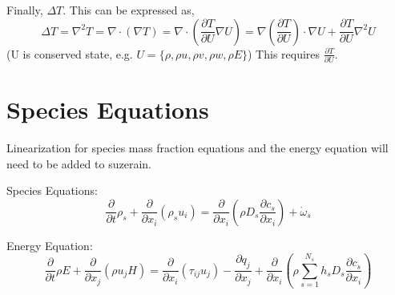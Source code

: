 \documentclass[10pt]{article}
\newcommand{\myred}[1]{{\color{red} #1}}
\begin{document}
Finally, $\Delta{}T$. This can be expressed as, 
\begin{equation}
\Delta T = \nabla^2 T = \nabla \cdot (\nabla T) = \nabla \cdot
 (\frac{\partial T}{\partial U} \nabla U) =  \nabla (\frac{\partial
 T}{\partial U} )\cdot \nabla U + \frac{\partial T}{\partial U} \nabla^2 U  
\end{equation}
(U is conserved state, e.g. $U=\{\rho,\rho u,\rho v, \rho w, \rho E
\}$) This requires $\frac{\partial T}{\partial U}$. 




\section{Species Equations}

Linearization for species mass fraction equations and the
energy equation will need to be added to suzerain. 

Species Equations:
\begin{equation}
 \frac{\partial}{\partial t} \rho_s + \frac{\partial}{\partial
  x_i}\left(\rho_s u_i\right) = \frac{\partial}{\partial x_i}\left(\rho D_s
  \frac{\partial c_s}{\partial x_i} \right) + \dot \omega_s
\end{equation}

Energy Equation:
\begin{equation}
\frac{\partial}{\partial t} \rho E + \frac{\partial }{\partial x_j}\left(\rho
u_j H\right) = \frac{\partial }{\partial x_i}\left(\tau_{ij}u_j\right) - \frac{\partial q_j
}{\partial x_j} + \frac{\partial }{\partial x_i}\left(\rho \sum^{N_s}_{s=1}
h_s D_s \frac{\partial c_s}{\partial x_i} \right)
\end{equation}
\end{document}
